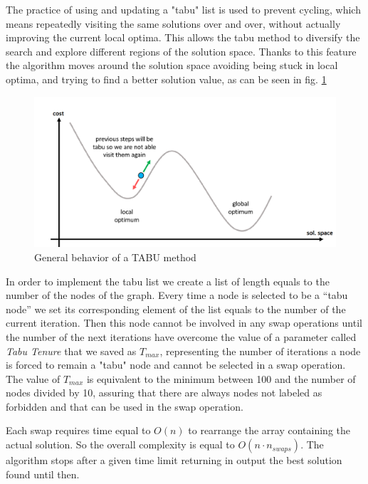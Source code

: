The practice of using and updating a "tabu" list is used to prevent cycling, which means repeatedly visiting the same solutions over and over, without actually improving the current local optima. This allows the tabu method to diversify the search and explore different regions of the solution space. Thanks to this feature the algorithm moves around the solution space avoiding being stuck in local optima, and trying to find a better solution value, as can be seen in fig. \ref{fig:TABU}

\begin{figure}[!h]
    \centering
    \includegraphics[width = \textwidth]{images/tabu.png}
    \caption{General behavior of a TABU method}
    \label{fig:TABU}
\end{figure}

In order to implement the tabu list we create a list of length equals to the number of the nodes of the graph. Every time a node is selected to be a “tabu node” we set its corresponding element of the list equals to the number of the current iteration. Then this node cannot be involved in any swap operations until the number of the next iterations have overcome the value of a parameter called \textit{Tabu Tenure} that we saved as $T_{max}$, representing the number of iterations a node is forced to remain a "tabu" node and cannot be selected in a swap operation.
The value of $T_{max}$ is equivalent to the minimum between 100 and the number of nodes divided by 10, assuring that there are always nodes not labeled as forbidden and that can be used in the swap operation.

Each swap requires time equal to $O(n)$ to rearrange the array containing the actual solution. So the overall complexity is equal to $O(n \cdot n_{swaps})$.
The algorithm stops after a given time limit returning in output the best solution found until then.

